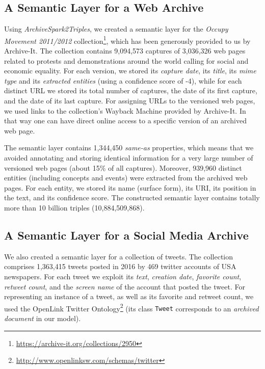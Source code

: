 \documentclass[twocolumn]{svjour3}
\newcommand{\tool}[0]{{\em ArchiveSpark2Triples}}
\begin{document}
\subsection{A Semantic Layer for a Web Archive}
\label{webArch}
Using \tool, we created a semantic layer
for the
\textit{Occupy Movement 2011/2012} collection\footnote{\url{https://archive-it.org/collections/2950}},
which has been generously provided to us by Archive-It.
The collection contains 9,094,573 captures of 3,036,326 web pages related to
protests and demonstrations around the world calling for social and economic equality.
For each version, we stored its {\em capture date},
its {\em title}, its {\em mime type} and its {\em extracted entities}
(using a confidence score of -4),
while for each distinct URL we stored its total number of captures,
the date of its first capture, and the date of its last capture.
For assigning URLs to the versioned web pages,
we used links to the collection's Wayback Machine provided by Archive-It.
In that way one can have direct online access to a specific version
of an archived web page.

The semantic layer contains 1,344,450 {\em same-as} properties,
which means that we avoided annotating and storing identical information
for a very large number of versioned web pages (about 15\% of all captures).
Moreover, 939,960 distinct entities (including concepts and events)
were extracted from the archived web pages.
For each entity, we stored its name (surface form),
its URI, its position in the text, and its confidence score.
The constructed semantic layer contains totally
more than 10 billion triples (10,884,509,868).





\subsection{A Semantic Layer for a Social Media Archive}
\label{tweetsArch}
We also created a semantic layer for a collection of tweets.
The collection comprises 1,363,415 tweets
posted in 2016 by 469 twitter accounts of USA newspapers.
For each tweet we exploit its {\em text}, {\em creation date},
{\em favorite count}, {\em retweet count}, and
the {\em screen name} of the account that posted the tweet.
For representing an instance of a tweet,
as well as its favorite and retweet count,
we used the OpenLink Twitter Ontology\footnote{\url{http://www.openlinksw.com/schemas/twitter}}
(its class {\tt Tweet} corresponds to an {\em archived document} in our model).
\end{document}
